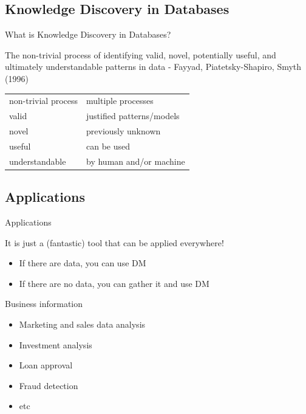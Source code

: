 \documentclass{beamer}
\begin{document}
\subsection{Knowledge Discovery in Databases}

\begin{frame}{What is Knowledge Discovery in Databases?}


\begin{block}{}
The non-trivial process of identifying valid, novel, potentially useful, and ultimately understandable patterns in data - Fayyad, Piatetsky-Shapiro, Smyth (1996)
\end{block}

\begin{center}
\begin{tabular}{l|l}
non-trivial process &  multiple processes\\
valid & justified patterns/models\\
novel & previously unknown\\
useful &  can be used\\
understandable & by human and/or machine
\end{tabular}
\end{center}


\end{frame}

\subsection{Applications}

\begin{frame}{Applications}

It is just a (fantastic) tool that can be applied everywhere!
\begin{itemize}
    \item If there are data, you can use DM
    \item If there are no data, you can gather it and use DM
\end{itemize}

Business information

\begin{itemize}
 \item Marketing and sales data analysis
 \item Investment analysis
 \item Loan approval
 \item Fraud detection
 \item etc
\end{itemize}

\end{frame}
\end{document}
